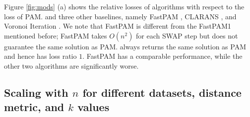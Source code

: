
Figure \ref{fig:mods} (a) shows the relative losses of algorithms with respect to the loss of PAM. 
\algname and three other baselines, namely FastPAM \cite{schubert2019faster}, CLARANS \cite{ng2002clarans}, and Voronoi Iteration \cite{park2009simple}. 
We note that FastPAM is different from the FastPAM1 mentioned before; FastPAM takes $O(n^2)$ for each SWAP step but does not guarantee the same solution as PAM. 
\algname always returns the same solution as PAM and hence has loss ratio $1$. FastPAM has a comparable performance, while the other two algorithms are significantly worse. 






\subsection{Scaling with \texorpdfstring{$n$}{Lg} for different datasets, distance metric, and \texorpdfstring{$k$}{Lg} values \label{subsec:scaling}}

